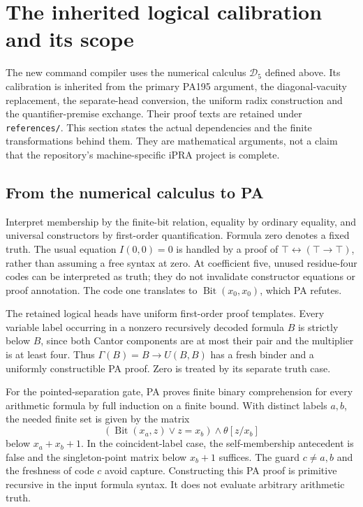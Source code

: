 \documentclass[11pt,letterpaper]{article}
\newcommand{\file}[1]{\texttt{\nolinkurl{#1}}}
\begin{document}
\clearpage


\section{The inherited logical calibration and its scope}
\label{sec:calibration}

The new command compiler uses the numerical calculus $\mathcal D_5$
defined above. Its calibration is inherited from the primary PA195
argument, the diagonal-vacuity replacement, the separate-head conversion,
the uniform radix construction and the quantifier-premise exchange.
Their proof texts are retained under \file{references/}. This section
states the actual dependencies and the finite transformations behind them.
They are mathematical arguments, not a claim that the repository's
machine-specific iPRA project is complete.

\subsection{From the numerical calculus to PA}

Interpret membership by the finite-bit relation, equality by ordinary
equality, and universal constructors by first-order quantification.
Formula zero denotes a fixed truth. The usual equation
$I(0,0)=0$ is handled by a proof of
$\top\leftrightarrow(\top\to\top)$, rather than assuming a free syntax
at zero. At coefficient five, unused residue-four codes can be interpreted
as truth; they do not invalidate constructor equations or proof annotation.
The code one translates to $\operatorname{Bit}(x_0,x_0)$, which PA refutes.

The retained logical heads have uniform first-order proof templates.
Every variable label occurring in a nonzero recursively decoded formula
$B$ is strictly below $B$, since both Cantor components are at most their
pair and the multiplier is at least four. Thus
$\Gamma(B)=B\to U(B,B)$ has a fresh binder and a uniformly constructible
PA proof. Zero is treated by its separate truth case.

For the pointed-separation gate, PA proves finite binary comprehension
for every arithmetic formula by full induction on a finite bound. With
distinct labels $a,b$, the needed finite set is given by the matrix
\[
 (\operatorname{Bit}(x_a,z)\lor z=x_b)\land\theta[z/x_b]
\]
below $x_a+x_b+1$. In the coincident-label case, the self-membership
antecedent is false and the singleton-point matrix below $x_b+1$ suffices.
The guard $c\ne a,b$ and the freshness of code $c$ avoid capture.
Constructing this PA proof is primitive recursive in the input formula
syntax. It does not evaluate arbitrary arithmetic truth.
\end{document}
